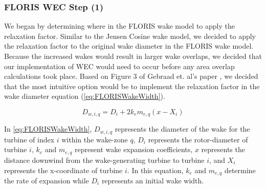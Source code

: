 \documentclass[a4paper]{jpconf}
\begin{document}

\subsubsection{FLORIS WEC Step (1)}

We began by determining where in the FLORIS wake model to apply the relaxation factor. Similar to the Jensen Cosine wake model, we decided to apply the relaxation factor to the original wake diameter in the FLORIS wake model. Because the increased wakes would result in larger wake overlaps, we decided that our implementation of WEC would need to occur before any area overlap calculations took place. Based on Figure 3 of Gebraad et. al's paper \cite{gebraad2014}, we decided that the most intuitive option would be to implement the relaxation factor in the wake diameter equation (\cref{eq:FLORISWakeWidth}).

\begin{equation}
    D_{w,i,q} = D_i + 2k_em_{e,q}(x - X_i)
    \label{eq:FLORISWakeWidth}
\end{equation}

In \cref{eq:FLORISWakeWidth}, $D_{w,i,q}$ represents the diameter of the wake for the turbine of index $i$ within the wake-zone $q$, $D_i$ represents the rotor-diameter of turbine $i$, $k_e$ and $m_{e,q}$ represent wake expansion coefficients, $x$ represents the distance downwind from the wake-generating turbine to turbine $i$, and $X_i$ represents the x-coordinate of turbine $i$. In this equation, $k_e$ and $m_{e,q}$ determine the rate of expansion while $D_i$ represents an initial wake width.
\end{document}
